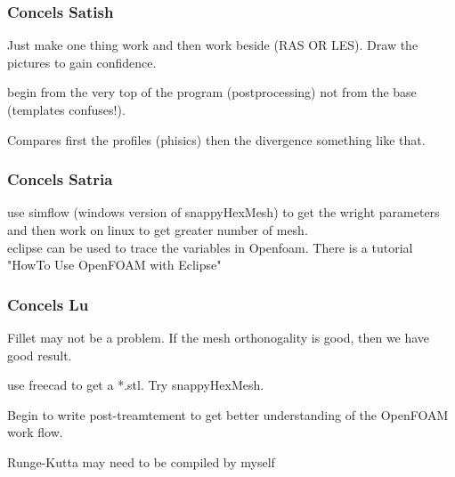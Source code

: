 \documentclass{beamer}
\begin{document}

\begin{frame}
\frametitle{Concels Satish}

Just make one thing work and then work beside (RAS OR LES).
Draw the pictures to gain confidence.

begin from the very top of the program (postprocessing) not from the base (templates confuses!).

Compares first the profiles (phisics) then the divergence something like that.

\end{frame}


\begin{frame}
\frametitle{Concels Satria}

use simflow (windows version of snappyHexMesh) to get the wright parameters and then work on linux to get greater number of mesh. \\

eclipse can be used to trace the variables in Openfoam. There is a tutorial "HowTo Use OpenFOAM with Eclipse"

\end{frame}


\begin{frame}
\frametitle{Concels Lu}

Fillet may not be a problem. If the mesh orthonogality is good, then we have good result.

use freecad to get a *.stl. Try snappyHexMesh.

Begin to write post-treamtement to get better understanding of the OpenFOAM work flow.

Runge-Kutta may need to be compiled by myself

\end{frame}
\end{document}
